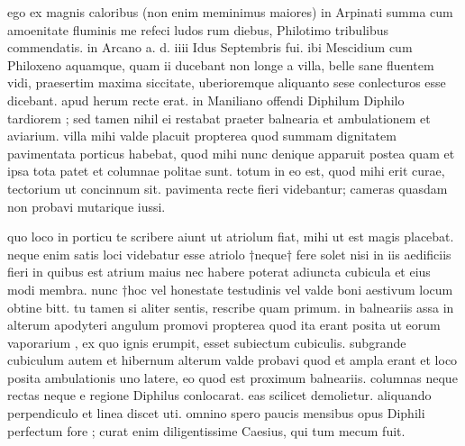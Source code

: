 


 ego ex magnis caloribus (non enim meminimus maiores) in Arpinati summa cum amoenitate fluminis me refeci ludos rum diebus, Philotimo tribulibus commendatis. in Arcano a. d. iiii Idus Septembris fui. ibi Mescidium cum Philoxeno aquamque, quam ii ducebant non longe a villa, belle sane fluentem vidi, praesertim maxima siccitate, uberioremque aliquanto sese conlecturos esse dicebant. apud herum recte erat. in Maniliano offendi Diphilum Diphilo tardiorem ; sed tamen nihil ei restabat praeter balnearia et ambulationem et aviarium. villa mihi valde placuit propterea quod summam dignitatem pavimentata porticus habebat, quod mihi nunc denique apparuit postea quam et ipsa tota patet et columnae politae sunt. totum in eo est, quod mihi erit curae, tectorium ut concinnum sit. pavimenta recte fieri videbantur; cameras quasdam non probavi mutarique iussi.

 quo loco in porticu te scribere aiunt ut atriolum fiat, mihi ut est magis placebat. neque enim satis loci videbatur esse atriolo †neque† fere solet nisi in iis aedificiis fieri in quibus est atrium maius nec habere poterat adiuncta cubicula et eius modi membra. nunc †hoc vel honestate testudinis vel valde boni aestivum locum obtine bitt. tu tamen si aliter sentis, rescribe quam primum. in balneariis assa in alterum apodyteri angulum promovi propterea quod ita erant posita ut eorum vaporarium , ex quo ignis erumpit, esset subiectum cubiculis. subgrande cubiculum autem et hibernum alterum valde probavi quod et ampla erant et loco posita ambulationis uno latere, eo quod est proximum balneariis. columnas neque rectas neque e regione Diphilus conlocarat. eas scilicet demolietur. aliquando perpendiculo et linea discet uti. omnino spero paucis mensibus opus Diphili perfectum fore ; curat enim diligentissime Caesius, qui tum mecum fuit.

